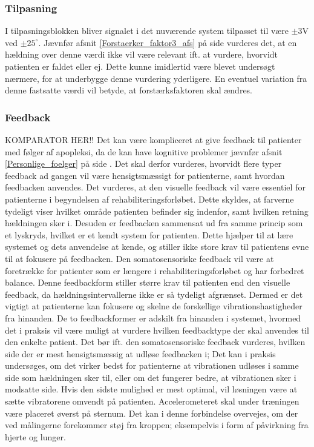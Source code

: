 \subsubsection{Tilpasning}
I tilpasningsblokken bliver signalet i det nuværende system tilpasset til være $\pm3$V ved $\pm25^{\circ}$. Jævnfør afsnit \ref{Forstaerker_faktor3_afs} på side \pageref{Forstaerker_faktor3_afs} vurderes det, at en hældning over denne værdi ikke vil være relevant ift. at vurdere, hvorvidt patienten er faldet eller ej. Dette kunne imidlertid være blevet undersøgt nærmere, for at underbygge denne vurdering yderligere. En eventuel variation fra denne fastsatte værdi vil betyde, at forstærksfaktoren skal ændres.  

\subsubsection{Feedback}
KOMPARATOR HER!!
Det kan være kompliceret at give feedback til patienter med følger af apopleksi, da de kan have kognitive problemer jævnfør afsnit \ref{Personlige_foelger} på side \pageref{Personlige_foelger}. Det skal derfor vurderes, hvorvidt flere typer feedback ad gangen vil være hensigtsmæssigt for patienterne, samt hvordan feedbacken anvendes. Det vurderes, at den visuelle feedback vil være essentiel for patienterne i begyndelsen af rehabiliteringsforløbet. Dette skyldes, at farverne tydeligt viser hvilket område patienten befinder sig indenfor, samt hvilken retning hældningen sker i. Desuden er feedbacken sammensat ud fra samme princip som et lyskryds, hvilket er et kendt system for patienten. Dette hjælper til at lære systemet og dets anvendelse at kende, og stiller ikke store krav til patientens evne til at fokusere på feedbacken. Den somatosensoriske feedback vil være at foretrække for patienter som er længere i rehabiliteringsforløbet og har forbedret balance. Denne feedbackform stiller større krav til patienten end den visuelle feedback, da hældningsintervallerne ikke er så tydeligt afgrænset. Dermed er det vigtigt at patienterne kan fokusere og skelne de forskellige vibrationshastigheder fra hinanden. De to feedbackformer er adskilt fra hinanden i systemet, hvormed det i praksis vil være muligt at vurdere hvilken feedbacktype der skal anvendes til den enkelte patient. 
Det bør ift. den somatosensoriske feedback vurderes, hvilken side der er mest hensigtsmæssig at udløse feedbacken i; Det kan i praksis undersøges, om det virker bedst for patienterne at vibrationen udløses i samme side som hældningen sker til, eller om det fungerer bedre, at vibrationen sker i modsatte side. Hvis den sidste mulighed er mest optimal, vil løsningen være at sætte vibratorene omvendt på patienten. 
Accelerometeret skal under træningen være placeret øverst på sternum. Det kan i denne forbindelse overvejes, om der ved målingerne forekommer støj fra kroppen; eksempelvis i form af påvirkning fra hjerte og lunger.

